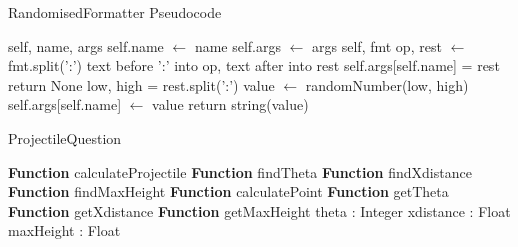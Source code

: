 \begin{algorithm}[h]
\label{randomformatterps}
\caption{RandomisedFormatter Pseudocode}
	\begin{algorithmic}[1]
		 {self, name, args}
		\State self.name $\gets$ name
		\State self.args $\gets$ args
		\EndFunction
		 {self, fmt}
		\State op, rest $\gets$ fmt.split(':') \Comment text before ':' into op, text after into  rest
		\State self.args[self.name] = rest
		\State return None
		\EndIf
		\State low, high = rest.split(':')
		\State value $\gets$ randomNumber(low, high)
		\State self.args[self.name] $\gets$ value
		\State return string(value)
		\EndIf
		\EndFunction
		\EndProcedure
	\end{algorithmic}
\end{algorithm}
\begin{algorithm}[h]\label{ProjectileQuestion}
	\caption{ProjectileQuestion}
	\begin{algorithmic}[1]
		\public
		\State \textbf{Function} calculateProjectile
		\State \textbf{Function} findTheta
		\State \textbf{Function} findXdistance
		\State \textbf{Function} findMaxHeight
		\State \textbf{Function} calculatePoint
		\State \textbf{Function} getTheta
		\State \textbf{Function} getXdistance
		\State \textbf{Function} getMaxHeight
		\endpublic
		\private
		\State theta : Integer
		\State xdistance : Float
		\State maxHeight : Float
		\endprivate
		\EndProcedure
	\end{algorithmic}
\end{algorithm}
